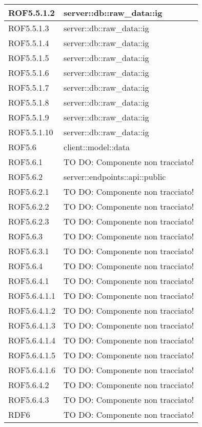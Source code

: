 \begin{center}
\begin{longtable}{| p{4cm} | p{8cm} |}
\hline
ROF5.5.1.2 & server::db::raw\_data::ig \\
\hline
ROF5.5.1.3 & server::db::raw\_data::ig \\
\hline
ROF5.5.1.4 & server::db::raw\_data::ig \\
\hline
ROF5.5.1.5 & server::db::raw\_data::ig \\
\hline
ROF5.5.1.6 & server::db::raw\_data::ig \\
\hline
ROF5.5.1.7 & server::db::raw\_data::ig \\
\hline
ROF5.5.1.8 & server::db::raw\_data::ig \\
\hline
ROF5.5.1.9 & server::db::raw\_data::ig \\
\hline
ROF5.5.1.10 & server::db::raw\_data::ig \\
\hline
ROF5.6 & client::model::data \\
\hline
ROF5.6.1 & TO DO: Componente non tracciato! \\
\hline
ROF5.6.2 & server::endpoints::api::public \\
\hline
ROF5.6.2.1 & TO DO: Componente non tracciato! \\
\hline
ROF5.6.2.2 & TO DO: Componente non tracciato! \\
\hline
ROF5.6.2.3 & TO DO: Componente non tracciato! \\
\hline
ROF5.6.3 & TO DO: Componente non tracciato! \\
\hline
ROF5.6.3.1 & TO DO: Componente non tracciato! \\
\hline
ROF5.6.4 & TO DO: Componente non tracciato! \\
\hline
ROF5.6.4.1 & TO DO: Componente non tracciato! \\
\hline
ROF5.6.4.1.1 & TO DO: Componente non tracciato! \\
\hline
ROF5.6.4.1.2 & TO DO: Componente non tracciato! \\
\hline
ROF5.6.4.1.3 & TO DO: Componente non tracciato! \\
\hline
ROF5.6.4.1.4 & TO DO: Componente non tracciato! \\
\hline
ROF5.6.4.1.5 & TO DO: Componente non tracciato! \\
\hline
ROF5.6.4.1.6 & TO DO: Componente non tracciato! \\
\hline
ROF5.6.4.2 & TO DO: Componente non tracciato! \\
\hline
ROF5.6.4.3 & TO DO: Componente non tracciato! \\
\hline
RDF6 & TO DO: Componente non tracciato! \\

\end{longtable}
\end{center}
